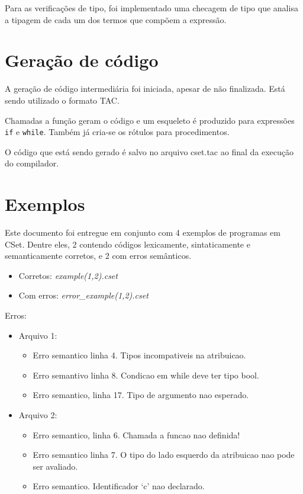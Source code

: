 \documentclass[12pt]{article}
\begin{document}
Para as verificações de tipo, foi implementado uma checagem de tipo que analisa a tipagem de cada um dos termos que compõem a expressão.

\section{Geração de código}

A geração de código intermediária foi iniciada, apesar de não finalizada. Está sendo utilizado o formato TAC.

Chamadas a função geram o código e um esqueleto é produzido para expressões \texttt{if} e \texttt{while}. Também já cria-se os rótulos para procedimentos.

O código que está sendo gerado é salvo no arquivo cset.tac ao final da execução do compilador.

\section{Exemplos}

Este documento foi entregue em conjunto com 4 exemplos de programas em CSet. Dentre eles, 2 contendo códigos lexicamente, sintaticamente e semanticamente corretos, e 2 com erros semânticos.

\begin{itemize}
\item Corretos: \textit{example(1,2).cset}
\item Com erros: \textit{error\_example(1,2).cset}
\end{itemize}

Erros:
\begin{itemize}
\item Arquivo 1:
\begin{itemize}
\item Erro semantico linha 4. Tipos incompativeis na atribuicao.
\item Erro semantivo linha 8. Condicao em while deve ter tipo bool.
\item Erro semantico, linha 17. Tipo de argumento nao esperado.
\end{itemize}

\item Arquivo 2:
\begin{itemize}
\item Erro semantico, linha 6. Chamada a funcao nao definida!
\item Erro semantico linha 7. O tipo do lado esquerdo da atribuicao nao pode ser avaliado.
\item Erro semantico. Identificador `c' nao declarado.
\end{itemize}
\end{itemize}
\end{document}
